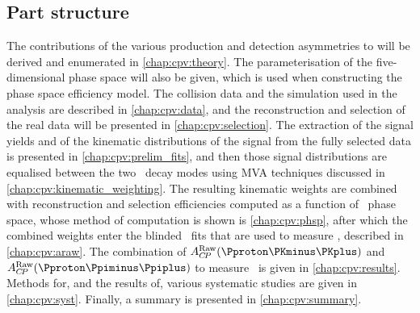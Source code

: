 \subsection{Part structure}
\label{chap:cpv:introduction:overview:structure}

The contributions of the various production and detection asymmetries to \ARaw
will be derived and enumerated in \cref{chap:cpv:theory}.
The parameterisation of the five-dimensional phase space will also be given,
which is used when constructing the phase space efficiency model.
The collision data and the simulation used in the analysis are described in
\cref{chap:cpv:data}, and the reconstruction and selection of the real data
will be presented in \cref{chap:cpv:selection}.
The extraction of the signal yields and of the kinematic distributions of the
signal from the fully selected data is presented in
\cref{chap:cpv:prelim_fits}, and then those signal distributions are equalised
between the two \PLambdac\ decay modes using \ac{MVA} techniques discussed in
\cref{chap:cpv:kinematic_weighting}.
The resulting kinematic weights are combined with reconstruction and selection
efficiencies computed as a function of \phh\ phase space, whose method of
computation is shown is \cref{chap:cpv:phsp}, after which the combined weights
enter the blinded \chisq\ fits that are used to measure \ARaw, described in
\cref{chap:cpv:araw}.
The combination of $\ARaw(\pKK)$ and $\ARaw(\ppipi)$ to measure \dACP\ is given
in \cref{chap:cpv:results}.
Methods for, and the results of, various systematic studies are given in
\cref{chap:cpv:syst}.
Finally, a summary is presented in \cref{chap:cpv:summary}.
